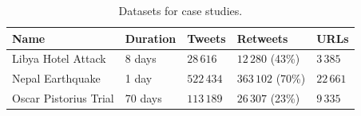 \begin{table}[ht!]
  \centering
  \caption{Datasets for case studies.}
  \label{tab:datasets}
  \begin{tabular}{@{}lllll@{}}
  \toprule
  Name                  & Duration & Tweets & Retweets & URLs  \\ \midrule Libya
  Hotel Attack    & 8 days   & $28\,616$ & $12\,280$ (43\%)  & $3\,385$
  \\
  Nepal Earthquake      & 1 day   & $522\,434$ & $363\,102$ (70\%) & $22\,661$
  \\ 
  Oscar Pistorius Trial & 70 days  & $113\,189$ & $26\,307$ (23\%)  & $9\,335$
  \\ \bottomrule
  \end{tabular}
\end{table}





